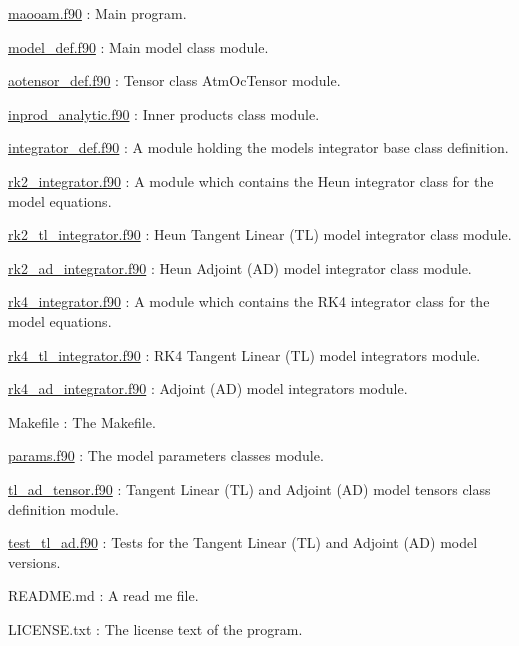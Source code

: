 \begin{DoxyItemize}
\item \hyperlink{maooam_8f90_source}{maooam.\+f90} \+: Main program.
\item \hyperlink{model__def_8f90_source}{model\+\_\+def.\+f90} \+: Main model class module.
\item \hyperlink{aotensor__def_8f90_source}{aotensor\+\_\+def.\+f90} \+: Tensor class Atm\+Oc\+Tensor module.
\item \hyperlink{inprod__analytic_8f90_source}{inprod\+\_\+analytic.\+f90} \+: Inner products class module.
\item \hyperlink{integrator__def_8f90_source}{integrator\+\_\+def.\+f90} \+: A module holding the model\textquotesingle{}s integrator base class definition.
\item \hyperlink{rk2__integrator_8f90_source}{rk2\+\_\+integrator.\+f90} \+: A module which contains the Heun integrator class for the model equations.
\item \hyperlink{rk2__tl__integrator_8f90_source}{rk2\+\_\+tl\+\_\+integrator.\+f90} \+: Heun Tangent Linear (TL) model integrator class module.
\item \hyperlink{rk2__ad__integrator_8f90_source}{rk2\+\_\+ad\+\_\+integrator.\+f90} \+: Heun Adjoint (AD) model integrator class module.
\item \hyperlink{rk4__integrator_8f90_source}{rk4\+\_\+integrator.\+f90} \+: A module which contains the R\+K4 integrator class for the model equations.
\item \hyperlink{rk4__tl__integrator_8f90_source}{rk4\+\_\+tl\+\_\+integrator.\+f90} \+: R\+K4 Tangent Linear (TL) model integrators module.
\item \hyperlink{rk4__ad__integrator_8f90_source}{rk4\+\_\+ad\+\_\+integrator.\+f90} \+: Adjoint (AD) model integrators module.
\item Makefile \+: The Makefile.
\item \hyperlink{params_8f90_source}{params.\+f90} \+: The model parameters classes module.
\item \hyperlink{tl__ad__tensor_8f90_source}{tl\+\_\+ad\+\_\+tensor.\+f90} \+: Tangent Linear (TL) and Adjoint (AD) model tensors class definition module.
\item \hyperlink{test__tl__ad_8f90_source}{test\+\_\+tl\+\_\+ad.\+f90} \+: Tests for the Tangent Linear (TL) and Adjoint (AD) model versions.
\item R\+E\+A\+D\+M\+E.\+md \+: A read me file.
\item L\+I\+C\+E\+N\+S\+E.\+txt \+: The license text of the program.

\end{DoxyItemize}
